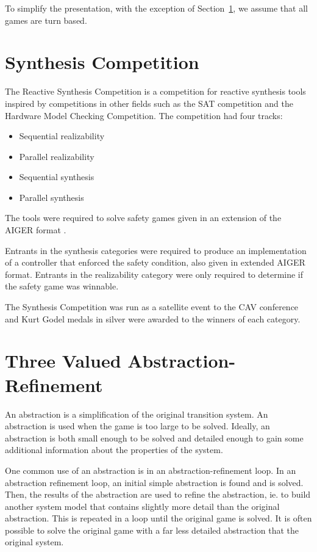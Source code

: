 To simplify the presentation, with the exception of Section~\ref{sec:syntcomp}, we assume that all games are turn based.

\section{Synthesis Competition}
\label{sec:syntcomp}

The Reactive Synthesis Competition is a competition for reactive synthesis tools inspired by competitions in other fields such as the SAT competition and the Hardware Model Checking Competition. The competition had four tracks:
\begin{itemize}
    \item Sequential realizability
    \item Parallel realizability
    \item Sequential synthesis
    \item Parallel synthesis
\end{itemize}

The tools were required to solve safety games given in an extension of the AIGER format \cite{aiger}. 

Entrants in the synthesis categories were required to produce an implementation of a controller that enforced the safety condition, also given in extended AIGER format. Entrants in the realizability category were only required to determine if the safety game was winnable.

The Synthesis Competition was run as a satellite event to the CAV conference and Kurt Godel medals in silver were awarded to the winners of each category.



\section{Three Valued Abstraction-Refinement}
An abstraction is a simplification of the original transition system. An abstraction is used when the game is too large to be solved. Ideally, an abstraction is both small enough to be solved and detailed enough to gain some additional information about the properties of the system. 

One common use of an abstraction is in an abstraction-refinement loop. In an abstraction refinement loop, an initial simple abstraction is found and is solved. Then, the results of the abstraction are used to refine the abstraction, ie. to build another system model that contains slightly more detail than the original abstraction. This is repeated in a loop until the original game is solved. It is often possible to solve the original game with a far less detailed abstraction that the original system. 

